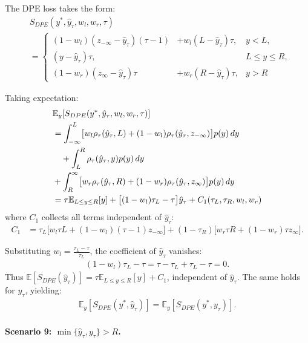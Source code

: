 \documentclass[sigconf]{acmart}
\begin{document}
The DPE loss takes the form:
\begin{align*}
&S_{DPE}(y^*, \hat{y}_\tau, w_l, w_r, \tau) \\
& = \left\{
\begin{aligned}
(1-w_l)(z_{-\infty}-\hat{y}_\tau)(\tau-1) &+ w_l(L-\hat{y}_\tau)\tau, & y < L, \\
(y-\hat{y}_\tau)\tau, & & L \le y \le R, \\
(1-w_r)(z_{\infty}-\hat{y}_\tau)\tau &+ w_r(R-\hat{y}_\tau)\tau, & y > R
\end{aligned}
\right.
\end{align*}

Taking expectation:
\begin{align*}
&\mathbb{E}_y[S_{DPE}(y^*, \hat{y}_\tau, w_l, w_r, \tau)] \notag\\
&= \int_{-\infty}^{L}\bigl[w_l\rho_\tau(\hat{y}_\tau, L) + (1-w_l)\rho_\tau(\hat{y}_\tau, z_{-\infty})\bigr]p(y)\,dy \notag\\
&\quad + \int_{L}^{R}\rho_\tau(\hat{y}_\tau, y)p(y)\,dy \\
& + \int_{R}^{\infty}\bigl[w_r\rho_\tau(\hat{y}_\tau, R) + (1-w_r)\rho_\tau(\hat{y}_\tau, z_{\infty})\bigr]p(y)\,dy \notag\\
&= \tau\mathbb{E}_{L\le y\le R}[y] + \bigl[(1-w_l)\tau_L - \tau\bigr]\hat{y}_\tau + C_1(\tau_L, \tau_R, w_l, w_r)
\end{align*}
where $C_1$ collects all terms independent of $\hat{y}_\tau$:
\begin{align*}
C_1 &= \tau_L\bigl[w_l\tau L + (1-w_l)(\tau-1)z_{-\infty}\bigr] + (1-\tau_R)\bigl[w_r\tau R + (1-w_r)\tau z_{\infty}\bigr].
\end{align*}

Substituting $w_l = \frac{\tau_L-\tau}{\tau_L}$, the coefficient of $\hat{y}_\tau$ vanishes:
\begin{align*}
(1-w_l)\tau_L - \tau = \tau - \tau_L + \tau_L - \tau = 0.
\end{align*}
Thus $\mathbb{E}[S_{DPE}(\hat{y}_\tau)] = \tau\mathbb{E}_{L\le y\le R}[y] + C_1$, independent of $\hat{y}_\tau$. The same holds for $y_\tau$, yielding:
\begin{align*}
\mathbb{E}_y[S_{DPE}(y^*, \hat{y}_\tau)] = \mathbb{E}_y[S_{DPE}(y^*, y_\tau)].
\end{align*}

\paragraph{Scenario 9: $\min\{\hat{y}_\tau, y_\tau\} > R$.}
\end{document}
